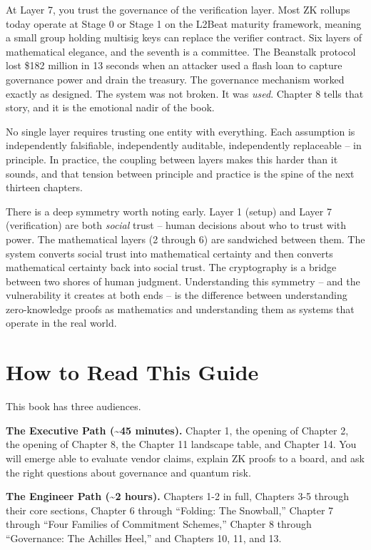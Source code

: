 \documentclass[
  11pt,
  openany]{report}
\renewcommand{\textbf}[1]{{\bfseries\color{MidnightBold}#1}}
\begin{document}
At Layer 7, you trust the governance of the verification layer. Most ZK rollups
today operate at Stage 0 or Stage 1 on the L2Beat maturity framework, meaning a
small group holding multisig keys can replace the verifier contract. Six layers
of mathematical elegance, and the seventh is a committee. The Beanstalk protocol
lost \$182 million in 13 seconds when an attacker used a flash loan to capture
governance power and drain the treasury. The governance mechanism worked exactly
as designed. The system was not broken. It was \emph{used}. Chapter 8 tells that
story, and it is the emotional nadir of the book.

No single layer requires trusting one entity with everything. Each assumption is
independently falsifiable, independently auditable, independently replaceable --
in principle. In practice, the coupling between layers makes this harder than it
sounds, and that tension between principle and practice is the spine of the next
thirteen chapters.

There is a deep symmetry worth noting early. Layer 1 (setup) and Layer 7
(verification) are both \emph{social} trust -- human decisions about who to
trust with power. The mathematical layers (2 through 6) are sandwiched between
them. The system converts social trust into mathematical certainty and then
converts mathematical certainty back into social trust. The cryptography is a
bridge between two shores of human judgment. Understanding this symmetry -- and
the vulnerability it creates at both ends -- is the difference between
understanding zero-knowledge proofs as mathematics and understanding them as
systems that operate in the real world.

\section{How to Read This Guide}\label{how-to-read-this-guide}

This book has three audiences.

\textbf{The Executive Path (\textasciitilde45 minutes).} Chapter 1, the opening
of Chapter 2, the opening of Chapter 8, the Chapter 11 landscape table, and
Chapter 14. You will emerge able to evaluate vendor claims, explain ZK proofs to
a board, and ask the right questions about governance and quantum risk.

\textbf{The Engineer Path (\textasciitilde2 hours).} Chapters 1-2 in full,
Chapters 3-5 through their core sections, Chapter 6 through ``Folding: The
Snowball,'' Chapter 7 through ``Four Families of Commitment Schemes,'' Chapter 8
through ``Governance: The Achilles Heel,'' and Chapters 10, 11, and 13.
\end{document}
